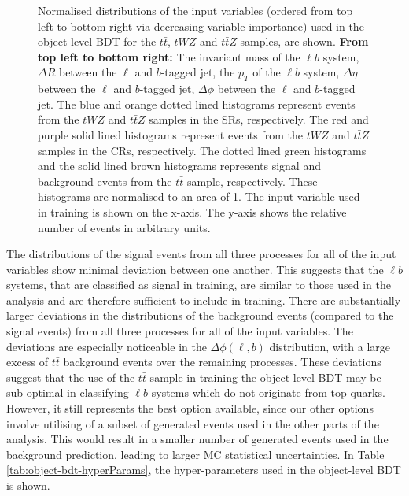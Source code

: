 \begin{figure}[h!]
    \caption{Normalised distributions of the input variables (ordered from top left to bottom right via decreasing variable importance) used in the object-level BDT for the $t\bar{t}$, $tWZ$ and $t\bar{t}Z$ samples, are shown. \textbf{From top left to bottom right:} The invariant mass of the $\ell b$ system, $\Delta R$ between the $\ell$ and $b$-tagged jet, the $p_{T}$ of the $\ell b$ system, $\Delta \eta$ between the $\ell$ and $b$-tagged jet, $\Delta \phi$ between the $\ell$ and $b$-tagged jet. The blue and orange dotted lined histograms represent events from the $tWZ$ and $t\bar{t}Z$ samples in the SRs, respectively. The red and purple solid lined histograms represent events from the $tWZ$ and $t\bar{t}Z$ samples in the CRs, respectively. The dotted lined green histograms and the solid lined brown histograms represents signal and background events from the $t\bar{t}$ sample, respectively. These histograms are normalised to an area of 1. The input variable used in training is shown on the x-axis. The y-axis shows the relative number of events in arbitrary units. }
    \label{fig:lb-vars-compare}
\end{figure}The distributions of the signal events from all three processes for all of the input variables show minimal deviation between one another. This suggests that the $\ell b$ systems, that are classified as signal in training, are similar to those used in the analysis and are therefore sufficient to include in training. There are substantially larger deviations in the distributions of the background events (compared to the signal events) from all three processes for all of the input variables. The deviations are especially noticeable in the $\Delta \phi (\ell, b)$ distribution, with a large excess of $t\bar{t}$ background events over the remaining processes. These deviations suggest that the use of the $t\bar{t}$ sample in training the object-level BDT may be sub-optimal in classifying $\ell b$ systems which do not originate from top quarks. However, it still represents the best option available, since our other options involve utilising of a subset of generated events used in the other parts of the analysis. This would result in a smaller number of generated events used in the background prediction, leading to larger MC statistical uncertainties. In Table \ref{tab:object-bdt-hyperParams}, the hyper-parameters used in the object-level BDT is shown.

